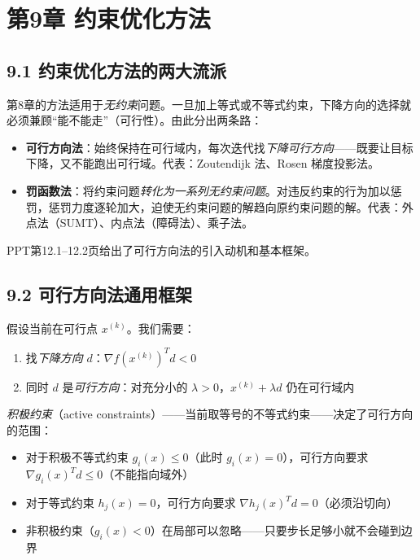 \section{第9章 \quad 约束优化方法}

\subsection{9.1 约束优化方法的两大流派}

第8章的方法适用于\emph{无约束}问题。一旦加上等式或不等式约束，下降方向的选择就必须兼顾“能不能走”（可行性）。由此分出两条路：

\begin{itemize}
  \item \textbf{可行方向法}：始终保持在可行域内，每次迭代找\emph{下降可行方向}——既要让目标下降，又不能跑出可行域。代表：Zoutendijk 法、Rosen 梯度投影法。
  \item \textbf{罚函数法}：将约束问题\emph{转化为一系列无约束问题}。对违反约束的行为加以惩罚，惩罚力度逐轮加大，迫使无约束问题的解趋向原约束问题的解。代表：外点法（SUMT）、内点法（障碍法）、乘子法。
\end{itemize}

PPT第12.1--12.2页给出了可行方向法的引入动机和基本框架。

\medskip
{}
\medskip
{}
\medskip

\subsection{9.2 可行方向法通用框架}

假设当前在可行点 $x^{(k)}$。我们需要：
\begin{enumerate}
  \item 找\emph{下降方向} $d$：$\nabla f(x^{(k)})^T d < 0$
  \item 同时 $d$ 是\emph{可行方向}：对充分小的 $\lambda > 0$，$x^{(k)} + \lambda d$ 仍在可行域内
\end{enumerate}

\emph{积极约束}（active constraints）——当前取等号的不等式约束——决定了可行方向的范围：
\begin{itemize}
  \item 对于积极不等式约束 $g_i(x) \le 0$（此时 $g_i(x)=0$），可行方向要求 $\nabla g_i(x)^T d \le 0$（不能指向域外）
  \item 对于等式约束 $h_j(x)=0$，可行方向要求 $\nabla h_j(x)^T d = 0$（必须沿切向）
  \item 非积极约束（$g_i(x) < 0$）在局部可以忽略——只要步长足够小就不会碰到边界
\end{itemize}

